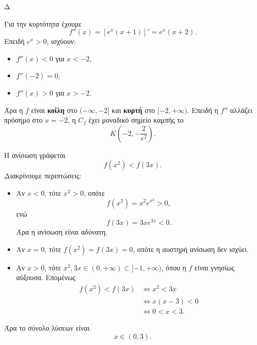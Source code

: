 \begin{thema}{Δ}
\begin{erwthma}
Για την κυρτότητα έχουμε
\[
f''(x)=\left[e^x(x+1)\right]'=e^x(x+2).
\]
Επειδή $e^x>0$, ισχύουν:
\begin{itemize}
\item $f''(x)<0$ για $x<-2$,
\item $f''(-2)=0$,
\item $f''(x)>0$ για $x>-2$.
\end{itemize}
Άρα η $f$ είναι \textbf{κοίλη} στο $(-\infty,-2]$ και \textbf{κυρτή} στο $[-2,+\infty)$. Επειδή η $f''$ αλλάζει πρόσημο στο $x=-2$, η $C_f$ έχει μοναδικό σημείο καμπής το
\[
{K\left(-2,-\frac{2}{e^2}\right)}.
\]

\item Η ανίσωση γράφεται
\[
f(x^2)<f(3x).
\]
Διακρίνουμε περιπτώσεις:
\begin{itemize}
\item Αν $x<0$, τότε $x^2>0$, οπότε
\[
f(x^2)=x^2e^{x^2}>0,
\]
ενώ
\[
f(3x)=3xe^{3x}<0.
\]
Άρα η ανίσωση είναι αδύνατη.

\item Αν $x=0$, τότε $f(x^2)=f(3x)=0$, οπότε η αυστηρή ανίσωση δεν ισχύει.

\item Αν $x>0$, τότε $x^2,3x\in(0,+\infty)\subset[-1,+\infty)$, όπου η $f$ είναι γνησίως αύξουσα. Επομένως
\begin{align*}
f(x^2)<f(3x)
&\Leftrightarrow x^2<3x\\
&\Leftrightarrow x(x-3)<0\\
&\Leftrightarrow 0<x<3.
\end{align*}
\end{itemize}
Άρα το σύνολο λύσεων είναι
\[
{x\in(0,3)}.
\]
\end{erwthma}
\end{thema}
